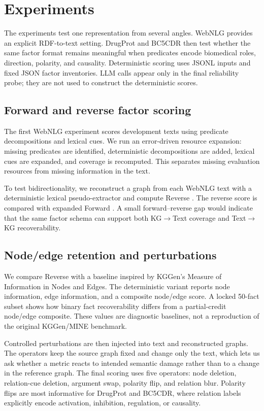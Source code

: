 
\section{Experiments}
The experiments test one representation from several angles. WebNLG provides an explicit RDF-to-text setting. DrugProt and BC5CDR then test whether the same factor format remains meaningful when predicates encode biomedical roles, direction, polarity, and causality. Deterministic scoring uses JSONL inputs and fixed JSON factor inventories. LLM calls appear only in the final reliability probe; they are not used to construct the deterministic scores.

\subsection{Forward and reverse factor scoring}
The first WebNLG experiment scores development texts using predicate decompositions and lexical cues. We run an error-driven resource expansion: missing predicates are identified, deterministic decompositions are added, lexical cues are expanded, and coverage is recomputed. This separates missing evaluation resources from missing information in the text.

To test bidirectionality, we reconstruct a graph from each WebNLG text with a deterministic lexical pseudo-extractor and compute Reverse \lemonscore{}. The reverse score is compared with expanded Forward \lemonscore{}. A small forward--reverse gap would indicate that the same factor schema can support both KG$\rightarrow$Text coverage and Text$\rightarrow$KG recoverability.

\subsection{Node/edge retention and perturbations}
We compare Reverse \lemonscore{} with a \minebase{} baseline inspired by KGGen's Measure of Information in Nodes and Edges. The deterministic variant reports node information, edge information, and a composite node/edge score. A locked 50-fact subset shows how binary fact recoverability differs from a partial-credit node/edge composite. These values are diagnostic baselines, not a reproduction of the original KGGen/MINE benchmark.

Controlled perturbations are then injected into text and reconstructed graphs. The operators keep the source graph fixed and change only the text, which lets us ask whether a metric reacts to intended semantic damage rather than to a change in the reference graph. The final scoring uses five operators: node deletion, relation-cue deletion, argument swap, polarity flip, and relation blur. Polarity flips are most informative for DrugProt and BC5CDR, where relation labels explicitly encode activation, inhibition, regulation, or causality.

